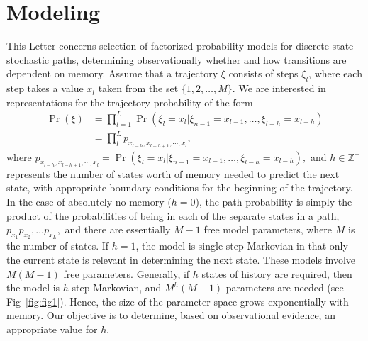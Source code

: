 \documentclass{IOS-Book-Article}
\renewcommand{\bf}[1]{\textbf{#1}}
\begin{document}
\section{Modeling}
This Letter concerns selection of factorized probability models for discrete-state stochastic paths, determining observationally whether and how transitions  are  dependent on memory. Assume that a trajectory $\xi$ consists of steps $\xi_l$, where each step takes  a value $x_l$ taken from the set $\{1,2,\ldots,M\}.$ We are interested in representations for the trajectory probability of the  form
\begin{align}
\Pr(\xi) &=\prod_{l=1}^L \Pr(\xi_l = x_l | \xi_{n-1} = x_{l-1}, \ldots, \xi_{l-h} = x_{l-h} )  \nonumber\\
&= \prod_{l}^L p_{x_{l-h},x_{l-h+1},\cdots,x_l}, 
\label{eq:factorize}
\end{align}
%
%
where $p_{x_{l-h},x_{l-h+1},\cdots,x_l} =  \Pr(\xi_l = x_l | \xi_{n-1} = x_{l-1}, \ldots, \xi_{l-h} = x_{l-h} ),$ and $h\in\mathbb{Z}^+$ represents the number of states worth of memory needed to predict the next state, with appropriate boundary conditions for the beginning of the trajectory. In the case of absolutely no memory ($h=0$), the path probability is simply the product of the probabilities of being in each of the separate states in a path, $p_{x_1}p_{x_2},\ldots p_{x_L},$ and there are essentially $M-1$ free model parameters, where $M$ is the number of states. If $h=1$, the model is single-step Markovian in that only the current state is relevant in determining the next state. These models involve $M(M-1)$ free parameters. Generally, if $h$ states of history are required, then the model is $h$-step Markovian, and $M^h(M-1)$ parameters are needed (see Fig~\ref{fig:fig1}). Hence, the size of the parameter space grows exponentially with memory. Our objective is to determine, based on observational evidence, an appropriate value for $h$. 

 
 
\end{document}
